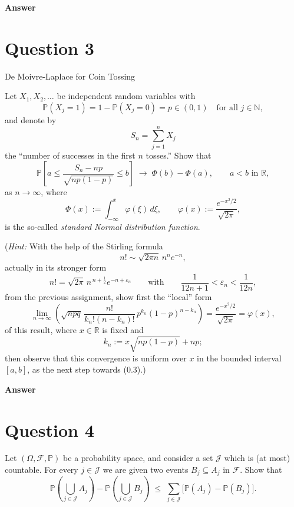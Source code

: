 \documentclass[letterpaper]{article}
\begin{document}
		\textbf{Answer}
		
		\clearpage
		
		\section{Question 3}
		
		{\color{deepred} De Moivre-Laplace for Coin Tossing} 
		
		Let $X_1,X_2,\dots$ be independent random variables with
			\[
			\mathbb{P}(X_j=1)=1-\mathbb{P}(X_j=0)=p\in(0,1)
			\quad \text{for all } j\in\mathbb{N},
			\]
			and denote by
			\[
			S_n=\sum_{j=1}^n X_j
			\]
			the ``number of successes in the first $n$ tosses.'' Show that
			\begin{equation}
				\mathbb{P}\!\left[
				a \le \frac{S_n-np}{\sqrt{np(1-p)}} \le b
				\right]
				\;\longrightarrow\;
				\Phi(b)-\Phi(a),
				\qquad a<b \text{ in } \mathbb{R},
				\tag{0.3}
			\end{equation}
			as $n\to\infty$, where
			\[
			\Phi(x):=\int_{-\infty}^x \varphi(\xi)\,d\xi,
			\qquad
			\varphi(x):=\frac{e^{-x^2/2}}{\sqrt{2\pi}},
			\]
			is the so-called \emph{standard Normal distribution function}.
			\medskip
			
			\noindent
			(\emph{Hint:} With the help of the Stirling formula
			\[
			n! \sim \sqrt{2\pi n}\,n^n e^{-n},
			\]
			actually in its stronger form
			\begin{equation}
				n! = \sqrt{2\pi}\, n^{\,n+\frac12} e^{-n+\varepsilon_n}
				\qquad \text{with} \qquad
				\frac{1}{12n+1}<\varepsilon_n<\frac{1}{12n},
				\tag{0.4}
			\end{equation}
			from the previous assignment, show first the ``local'' form
			\[
			\lim_{n\to\infty}
			\left(
			\sqrt{npq}\,
			\frac{n!}{k_n!(n-k_n)!}\,
			p^{k_n}(1-p)^{n-k_n}
			\right)
			=
			\frac{e^{-x^2/2}}{\sqrt{2\pi}}
			=\varphi(x),
			\]
			of this result, where $x\in\mathbb{R}$ is fixed and
			\[
			k_n := x\sqrt{np(1-p)}+np;
			\]
			then observe that this convergence is uniform over $x$ in the bounded
			interval $[a,b]$, as the next step towards \textup{(0.3)}.)
		
		
		\textbf{Answer}
		
		\clearpage
		
		\section{Question 4}
		Let $(\Omega, \mathcal{F}, \mathbb{P})$ be a probability space,
			and consider a set $\mathcal{J}$ which is (at most) countable.
			For every $j \in \mathcal{J}$ we are given two events
			$B_j \subseteq A_j$ in $\mathcal{F}$. Show that
			\[
			\mathbb{P}\!\left(\bigcup_{j \in \mathcal{J}} A_j\right)
			-
			\mathbb{P}\!\left(\bigcup_{j \in \mathcal{J}} B_j\right)
			\;\le\;
			\sum_{j \in \mathcal{J}}
			\bigl[\mathbb{P}(A_j) - \mathbb{P}(B_j)\bigr].
			\]
			
\end{document}
